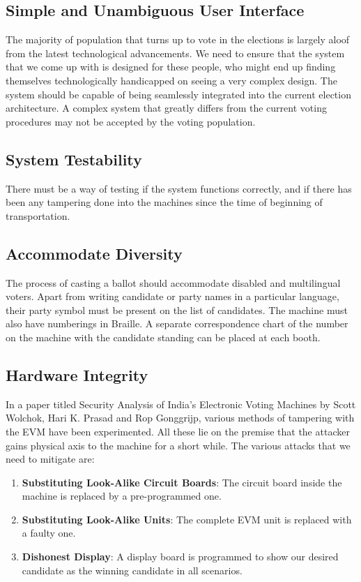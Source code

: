 \documentclass[a4paper,12pt]{extarticle}
\begin{document}
\subsection{Simple and Unambiguous User Interface}

The majority of population that turns up to vote in the elections is largely aloof from the latest technological advancements. We need to ensure that the system that we come up with is designed for these people, who might end up finding themselves technologically handicapped on seeing a very complex design.
The system should be capable of being seamlessly integrated into the current election architecture.  A complex system that greatly differs from the current voting procedures may not be accepted by the voting population.

\subsection{System Testability}

There must be a way of testing if the system functions correctly, and if there has been any tampering done into the machines since the time of beginning of transportation. 

\subsection{Accommodate Diversity}

The process of casting a ballot should accommodate disabled and multilingual voters. Apart from writing candidate or party names in a particular language, their party symbol must be present on the list of candidates. The machine must also have numberings in Braille. A separate correspondence chart of the number on the machine with the candidate standing can be placed at each booth.

\subsection{Hardware Integrity}
In a paper titled Security Analysis of India’s Electronic Voting Machines by Scott Wolchok, Hari K. Prasad and Rop Gonggrijp, various methods of tampering with the EVM have been experimented. All these lie on the premise that the attacker gains physical axis to the machine for a short while. The various attacks that we need to mitigate are:
\begin{enumerate}
\item \textbf{Substituting Look-Alike Circuit Boards}: The circuit board inside the machine is replaced by a pre-programmed one.
\item \textbf{Substituting Look-Alike Units}: The complete EVM unit is replaced with a faulty one.
\item \textbf{Dishonest Display}: A display board is programmed  to show our desired candidate as the winning candidate in all scenarios. 

\end{enumerate}
\end{document}

